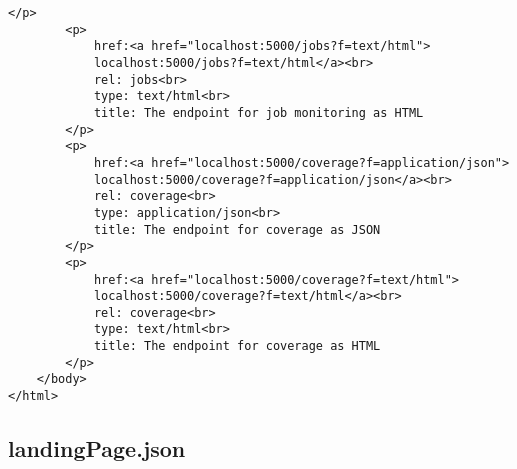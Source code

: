 \begin{lstlisting}[caption={landingPage.html}, style = HTML]
		</p>
		<p>
			href:<a href="localhost:5000/jobs?f=text/html">
            localhost:5000/jobs?f=text/html</a><br>
			rel: jobs<br>
			type: text/html<br>
			title: The endpoint for job monitoring as HTML
		</p>
		<p>
			href:<a href="localhost:5000/coverage?f=application/json">
            localhost:5000/coverage?f=application/json</a><br>
			rel: coverage<br>
			type: application/json<br>
			title: The endpoint for coverage as JSON
		</p>
		<p>
			href:<a href="localhost:5000/coverage?f=text/html">
            localhost:5000/coverage?f=text/html</a><br>
			rel: coverage<br>
			type: text/html<br>
			title: The endpoint for coverage as HTML
		</p>
	</body>
</html>
\end{lstlisting}\label{appendixlandingPageHTML}  

\subsection{landingPage.json}
